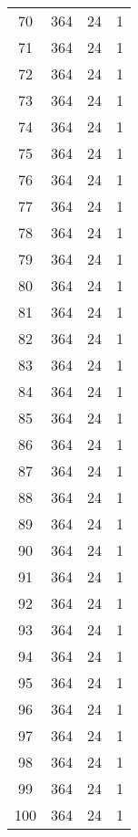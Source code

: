 \begin{longtable}[!]{c|ccc}
	70	& 364	& 24	& 1	\\
	71	& 364	& 24	& 1	\\
	72	& 364	& 24	& 1	\\
	73	& 364	& 24	& 1	\\
	74	& 364	& 24	& 1	\\
	75	& 364	& 24	& 1	\\
	76	& 364	& 24	& 1	\\
	77	& 364	& 24	& 1	\\
	78	& 364	& 24	& 1	\\
	79	& 364	& 24	& 1	\\
	80	& 364	& 24	& 1	\\
	81	& 364	& 24	& 1	\\
	82	& 364	& 24	& 1	\\
	83	& 364	& 24	& 1	\\
	84	& 364	& 24	& 1	\\
	85	& 364	& 24	& 1	\\
	86	& 364	& 24	& 1	\\
	87	& 364	& 24	& 1	\\
	88	& 364	& 24	& 1	\\
	89	& 364	& 24	& 1	\\
	90	& 364	& 24	& 1	\\
	91	& 364	& 24	& 1	\\
	92	& 364	& 24	& 1	\\
	93	& 364	& 24	& 1	\\
	94	& 364	& 24	& 1	\\
	95	& 364	& 24	& 1	\\
	96	& 364	& 24	& 1	\\
	97	& 364	& 24	& 1	\\
	98	& 364	& 24	& 1	\\
	99	& 364	& 24	& 1	\\
	100	& 364	& 24	& 1	\\
\end{longtable}


